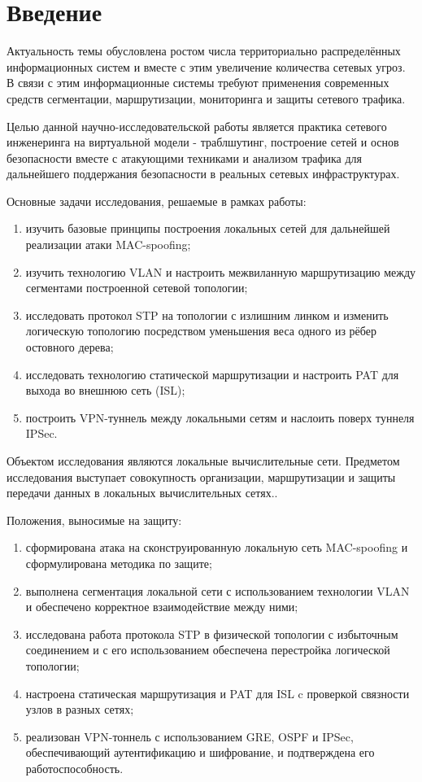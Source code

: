 \chapter*{Введение}
\label{ch:intro}

Актуальность темы обусловлена ростом числа территориально распределённых информационных систем и вместе с этим увеличение количества сетевых угроз.
В связи с этим информационные системы требуют применения современных средств сегментации, маршрутизации, мониторинга и защиты сетевого трафика.

Целью данной научно-исследовательской работы является практика сетевого инженеринга на виртуальной модели - траблшутинг, построение сетей и основ безопасности вместе с атакующими техниками и анализом трафика для дальнейшего поддержания безопасности в реальных сетевых инфраструктурах.

Основные задачи исследования, решаемые в рамках работы:
\begin{enumerate}
    \item изучить базовые принципы построения локальных сетей для дальнейшей реализации атаки MAC-spoofing;
    \item изучить технологию VLAN и настроить межвиланную маршрутизацию между сегментами построенной сетевой топологии;
    \item исследовать протокол STP на топологии с излишним линком и изменить логическую топологию посредством уменьшения веса одного из рёбер остовного дерева;
    \item исследовать технологию статической маршрутизации и настроить PAT для выхода во внешнюю сеть (ISL);
    \item построить VPN-туннель между локальными сетям и наслоить поверх туннеля IPSec.
\end{enumerate}

Объектом исследования являются локальные вычислительные сети. Предметом исследования выступает совокупность организации, маршрутизации и защиты передачи данных в локальных вычислительных сетях..

Положения, выносимые на защиту:
\begin{enumerate}
    \item сформирована атака на сконструированную локальную сеть MAC-spoofing и сформулирована методика по защите;
    \item выполнена сегментация локальной сети с использованием технологии VLAN и обеспечено корректное взаимодействие между ними;
    \item исследована работа протокола STP в физической топологии с избыточным соединением и с его использованием обеспечена перестройка логической топологии;
    \item настроена статическая маршрутизация и PAT для ISL c проверкой связности узлов в разных сетях;
    \item реализован VPN-тоннель с использованием GRE, OSPF и IPSec, обеспечивающий аутентификацию и шифрование, и подтверждена его работоспособность.
\end{enumerate}

